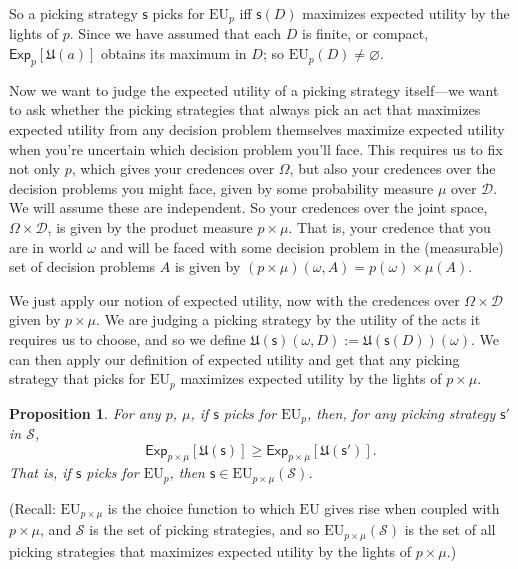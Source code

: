 \documentclass[a4paper]{article}
\newtheorem{proposition}[theorem]{Proposition}
\newcommand\D{\mathcal{D}}
\renewcommand\S{\mathcal{S}}
\newcommand\s{\mathsf{s}}
\newcommand\Exp{\mathsf{Exp}}
\newcommand\EU{\mathrm{EU}}
\newcommand\U{\mathfrak{U}} %
\newcommand{\Strategies}{\mathcal{S}}
\renewcommand{\emptyset}{\varnothing}
\renewcommand{\geq}{\geqslant}
\newenvironment{CCM rewritten}
{\begingroup\color{blue}} %
{\endgroup}              %
\begin{document}

So a picking strategy $\s$ picks for $\EU_p$ iff $\s(D)$ maximizes expected utility by the lights of $p$.
Since we have assumed that each $D$ is finite, or compact, $\Exp_p[\U(a)]$ obtains its maximum in $D$; so $\EU_p(D)\neq\emptyset$. 

Now we want to judge the expected utility of a picking strategy itself---we want to ask whether the picking strategies that always pick an act that maximizes expected utility from any decision problem themselves maximize expected utility when you're uncertain which decision problem you'll face. This requires us to fix not only $p$, which gives your credences over $\Omega$, but also your credences over the decision problems you might face, given by some probability measure $\mu$ over $\D$. We will assume these are independent. %
{ So your credences over the joint space, $\Omega\times\D$, is given by the product measure $p\times\mu$. That is, your credence that you are in world $\omega$ and will be faced with some decision problem in the (measurable) set of decision problems $A$ is given by $(p\times\mu)(\omega,A)=p(\omega)\times\mu(A)$.}


We just apply our notion of expected utility, now with the credences over $\Omega\times\D$ given by %
{ $p\times\mu$.} We are judging a picking strategy by the utility of the acts it requires us to choose, and so we define $\U(\s)(\omega,D):=\U(\s(D))(\omega)$. We can then apply our definition of expected utility and get that any picking strategy that picks for $\EU_p$ maximizes expected utility by the lights of %
{ $p\times\mu$.}
\begin{proposition}\label{thm:eu-self-rec}
	For any $p$, $\mu$, if $\s$ picks for $\EU_p$, then, for any picking strategy $\s'$ in $\S$,
	$$\Exp_{p\times\mu}[\U(\s)]\geq\Exp_{p\times\mu}[\U(\s')].$$
	That is, if $\s$ picks for $\EU_p$, then $\s\in\EU_{p\times\mu}(\Strategies)$. 
	\end{proposition}
(Recall: $\EU_{p\times \mu}$ is the choice function to which $\EU$ gives rise when coupled with %
{ $p\times\mu$}, and $\Strategies$ is the set of picking strategies, and so $\EU_{p\times \mu}(\Strategies)$ is the set of all picking strategies that maximizes expected utility by the lights of %
{ $p\times\mu$.})
\end{document}
